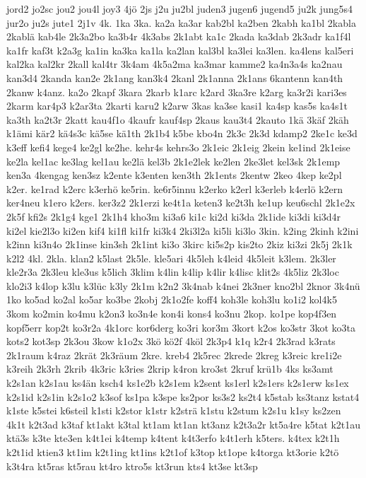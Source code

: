 {jord2
jo2sc
jou2
jou4l
joy3
4jö
2js
j2u
ju2bl
juden3
jugen6
jugend5
ju2k
jung5s4
jur2o
ju2s
jute1
2j1v
4k.
1ka
3ka.
ka2a
ka3ar
kab2bl
ka2ben
2kabh
ka1bl
2kabla
2kablä
kab4le
2k3a2bo
ka3b4r
4k3abs
2k1abt
ka1c
2kada
ka3dab
2k3adr
ka1f4l
ka1fr
kaf3t
k2a3g
ka1in
ka3ka
ka1la
ka2lan
kal3bl
ka3lei
ka3len.
ka4lens
kal5eri
kal2ka
kal2kr
2kall
kal4tr
3k4am
4k5a2ma
ka3mar
kamme2
ka4n3a4s
ka2nau
kan3d4
2kanda
kan2e
2k1ang
kan3k4
2kanl
2k1anna
2k1ans
6kantenn
kan4th
2kanw
k4anz.
ka2o
2kapf
3kara
2karb
k1arc
k2ard
3ka3re
k2arg
ka3r2i
kari3es
2karm
kar4p3
k2ar3ta
2karti
karu2
k2arw
3kas
ka3se
kasi1
ka4sp
kas5s
ka4s1t
ka3th
ka2t3r
2katt
kau4f1o
4kaufr
kauf4sp
2kaus
kau3t4
2kauto
1kä
3käf
2käh
k1ämi
kär2
kä4s3c
kä5se
kä1th
2k1b4
k5be
kbo4n
2k3c
2k3d
kdamp2
2ke1c
ke3d
k3eff
kefi4
kege4
ke2gl
ke2he.
kehr4s
kehrs3o
2k1eic
2k1eig
2kein
ke1ind
2k1eise
ke2la
kel1ac
ke3lag
kel1au
ke2lä
kel3b
2k1e2lek
ke2len
2ke3let
kel3sk
2k1emp
ken3a
4kengag
ken3sz
k2ente
k3enten
ken3th
2k1ents
2kentw
2keo
4kep
ke2pl
k2er.
ke1rad
k2erc
k3erhö
ke5rin.
ke6r5innu
k2erko
k2erl
k3erleb
k4erlö
k2ern
ker4neu
k1ero
k2ers.
ker3z2
2k1erzi
ke4t1a
keten3
ke2t3h
ke1up
keu6schl
2k1e2x
2k5f
kfi2s
2k1g4
kge1
2k1h4
kho3m
ki3a6
ki1c
ki2d
ki3da
2k1ide
ki3di
ki3d4r
ki2el
kie2l3o
ki2en
kif4
ki1fl
ki1fr
ki3k4
2ki3l2a
ki5li
ki3lo
3kin.
k2ing
2kinh
k2ini
k2inn
ki3n4o
2k1inse
kin3sh
2k1int
ki3o
3kirc
ki5s2p
kis2to
2kiz
ki3zi
2k5j
2k1k
k2l2
4kl.
2kla.
klan2
k5last
2k5le.
kle5ari
4k5leh
k4leid
4k5leit
k3lem.
2k3ler
kle2r3a
2k3leu
kle3us
k5lich
3klim
k4lin
k4lip
k4lir
k4lisc
klit2s
4k5liz
2k3loc
klo2i3
k4lop
k3lu
k3lüc
k3ly
2k1m
k2n2
3k4nab
k4nei
2k3ner
kno2bl
2knor
3k4nü
1ko
ko5ad
ko2al
ko5ar
ko3be
2kobj
2k1o2fe
koff4
koh3le
koh3lu
ko1i2
kol4k5
3kom
ko2min
ko4mu
k2on3
ko3n4e
kon4i
kons4
ko3nu
2kop.
ko1pe
kop4f3en
kopf5err
kop2t
ko3r2a
4k1orc
kor6derg
ko3ri
kor3m
3kort
k2os
ko3str
3kot
ko3ta
kots2
kot3sp
2k3ou
3kow
k1o2x
3kö
kö2f
4köl
2k3p4
k1q
k2r4
2k3rad
k3rats
2k1raum
k4raz
2krät
2k3räum
2kre.
kreb4
2k5rec
2krede
2kreg
k3reic
kre1i2e
k3reih
2k3rh
2krib
4k3ric
k3ries
2krip
k4ron
kro3st
2kruf
krü1b
4ks
ks3amt
k2s1an
k2s1au
ks4än
ksch4
ks1e2b
k2s1em
k2sent
ks1erl
k2s1ers
k2s1erw
ks1ex
k2s1id
k2s1in
k2s1o2
k3sof
ks1pa
k3spe
ks2por
ks3s2
ks2t4
k5stab
ks3tanz
kstat4
k1ste
k5stei
k6steil
k1sti
k2stor
k1str
k2strä
k1stu
k2stum
k2s1u
k1sy
ks2zen
4k1t
k2t3ad
k3taf
kt1akt
k3tal
kt1am
kt1an
kt3anz
k2t3a2r
kt5a4re
k5tat
k2t1au
ktä3s
k3te
kte3en
k4t1ei
k4temp
k4tent
k4t3erfo
k4t1erh
k5ters.
k4tex
k2t1h
k2t1id
ktien3
kt1im
k2t1ing
kt1ins
k2t1of
k3top
kt1ope
k4torga
kt3orie
k2tö
k3t4ra
kt5ras
kt5rau
kt4ro
ktro5s
kt3run
kts4
kt3se
kt3sp
}
